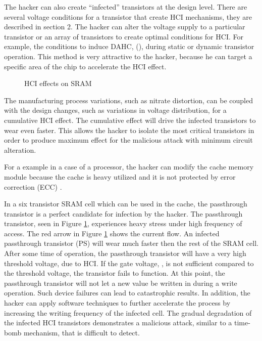 \documentclass[12pt,conference]{IEEEtran}
\begin{document}
 
The hacker can also create ``infected'' transistors at the design level.  There are several voltage conditions for a transistor that create HCI mechanisms, they are described in section 2.  The hacker can alter the voltage supply to a particular transistor or an array of transistors to create optimal conditions for HCI.  For example, the conditions to induce DAHC, (), during static or dynamic transistor operation.  This method is very attractive to the hacker, because he can target a specific area of the chip to accelerate the HCI effect.  


\begin{figure}[htp]
\caption{HCI effects on SRAM}
\label{figHCI4}
\end{figure}


The manufacturing process variations, such as nitrate distortion, can be coupled with the design changes, such as variations in voltage distribution, for a cumulative HCI effect.  The cumulative effect will drive the infected transistors to wear even faster.  This allows the hacker to isolate the most critical transistors in order to produce maximum effect for the malicious attack with minimum circuit alteration.  

For a example in a case of a processor, the hacker can modify the cache memory module because the cache is heavy utilized and it is not protected by error correction (ECC) \cite{CACHE07A}.


In a six transistor SRAM cell which can be used in the cache, the passthrough transistor is a perfect candidate for infection by the hacker.  The passthrough transistor, seen in Figure \ref{figHCI4}, experiences heavy stress under high frequency of access.  The red arrow in Figure \ref{figHCI4} shows the current flow. An infected passthrough transistor (PS) will wear much faster then the rest of the SRAM cell.  After some time of operation, the passthrough transistor will have a very high threshold voltage,  due to HCI.  If the gate voltage, , is not sufficient compared to the threshold voltage, the transistor fails to function.  At this point, the passthrough transistor will not let a new value be written in during a write operation.   Such device failures can lead to catastrophic results. In addition, the hacker can apply software techniques to further accelerate the process by increasing the writing frequency of the infected cell.  The gradual degradation of the infected HCI transistors demonstrates a malicious attack, similar to  a time-bomb mechanism, that is difficult to detect. 
\end{document}
